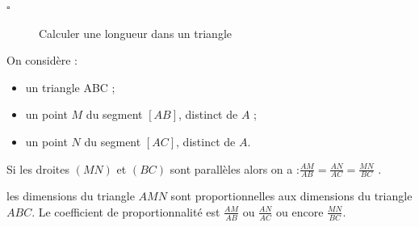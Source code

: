 \documentclass[openany]{book}
\begin{document}
\begin{titre}

\end{titre}


\begin{CpsCol}
\textbf{}
\begin{description}
\item[$\square$] Calculer une longueur dans un triangle
\end{description}
\end{CpsCol}




\begin{Th}
On considère :	
\begin{itemize}
\item un triangle ABC ; 
\item un point $M$ du segment $\left[AB\right]$, distinct de $A$ ;
\item un point $N$ du segment $\left[AC\right]$, distinct de $A$. 
\end{itemize}
Si les droites $\left(MN\right)$ et $\left(BC\right)$ sont parallèles	alors on a :$\frac{AM}{AB}=\frac{AN}{AC}=\frac{MN}{BC}$ .
\end{Th}





\begin{Rq} 
les dimensions du triangle $AMN$ sont proportionnelles aux dimensions du triangle $ABC$.
Le coefficient de proportionnalité est $\frac{AM}{AB}$ ou $\frac{AN}{AC}$ ou encore $\frac{MN}{BC}$.
\end{Rq}
\end{document}
